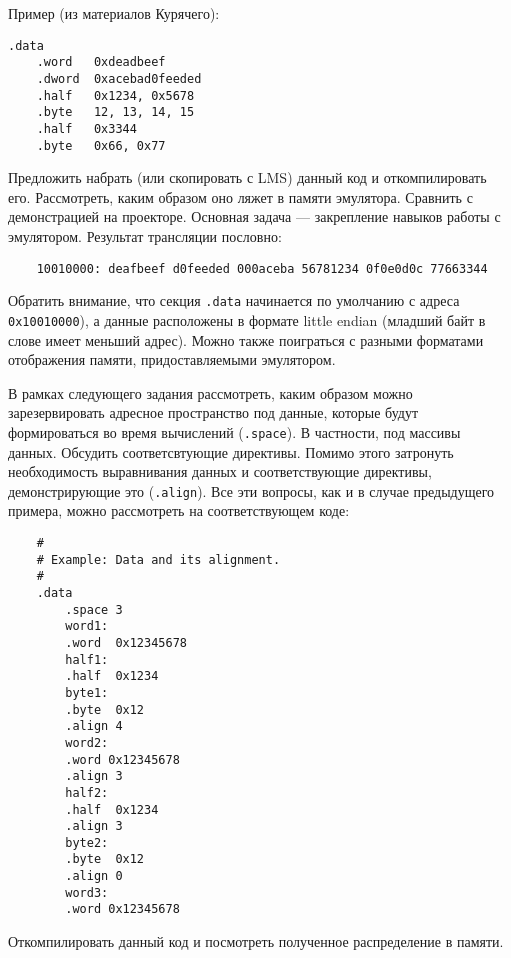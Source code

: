 Пример (из материалов Курячего):
\begin{verbatim}
.data
    .word   0xdeadbeef
    .dword  0xacebad0feeded
    .half   0x1234, 0x5678
    .byte   12, 13, 14, 15
    .half   0x3344
    .byte   0x66, 0x77
\end{verbatim}

Предложить набрать (или скопировать с LMS) данный код и откомпилировать его. Рассмотреть, каким образом оно ляжет в памяти эмулятора. Сравнить с демонстрацией на проекторе. Основная задача --- закрепление навыков работы с эмулятором.
Результат трансляции пословно:
\begin{verbatim}
    10010000: deafbeef d0feeded 000aceba 56781234 0f0e0d0c 77663344
\end{verbatim}
Обратить внимание, что секция \verb|.data| начинается по умолчанию с адреса \verb|0x10010000|), а данные расположены в формате little endian (младший байт в слове имеет меньший адрес). Можно также поиграться с разными форматами отображения памяти, придоставляемыми эмулятором.

В рамках следующего задания рассмотреть, каким образом можно зарезервировать адресное пространство под данные, которые будут формироваться во время вычислений (\verb|.space|). В частности, под массивы данных. Обсудить соответсвтующие директивы. Помимо этого затронуть необходимость выравнивания данных и соответствующие директивы, демонстрирующие это (\verb|.align|). Все эти вопросы, как и в случае предыдущего примера, можно рассмотреть на соответствующем коде:
\begin{verbatim}
    #
    # Example: Data and its alignment.
    #
    .data
        .space 3
        word1:
        .word  0x12345678
        half1:
        .half  0x1234
        byte1:
        .byte  0x12
        .align 4
        word2:
        .word 0x12345678
        .align 3
        half2:
        .half  0x1234
        .align 3
        byte2:
        .byte  0x12
        .align 0
        word3:
        .word 0x12345678
\end{verbatim}
Откомпилировать данный код и посмотреть полученное распределение в памяти.
